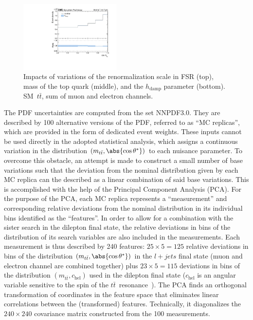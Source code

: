 \begin{figure}
  \includegraphics[width=0.45\textwidth]{fig/chapt7/syst/impacts/CosTopLepTT/hDamp.pdf}
  \caption{Impacts of variations of the renormalization scale in FSR (top), mass of the top quark (middle), and the $h_\text{damp}$ parameter (bottom). SM~$t\bar t$, sum of muon and electron channels.}
  \label{Fig:SystTTSamples}
\end{figure}

The PDF uncertainties are computed from the set NNPDF3.0.
They are described by 100 alternative versions of the PDF, referred to as ``MC replicas'', which are provided in the form of dedicated event weights.
These inputs cannot be used directly in the adopted statistical analysis, which assigns a continuous variation in the distribution $(m_{t\bar t}, \abs{\cos\theta^*})$ to each nuisance parameter.
To overcome this obstacle, an attempt is made to construct a small number of base variations such that the deviation from the nominal distribution given by each MC replica can the described as a linear combination of said base variations.
This is accomplished with the help of the Principal Component Analysis (PCA).
For the purpose of the PCA, each MC replica represents a ``measurement'' and corresponding relative deviations from the nominal distribution in its individual bins identified as the ``features''.
In order to allow for a combination with the sister search in the dilepton final state, the relative deviations in bins of the distribution of its search variables are also included in the measurements.
Each measurement is thus described by 240 features: $25 \times 5 = 125$ relative deviations in bins of the distribution $(m_{t\bar t}, \abs{\cos\theta^*})$ in the $l+jets$ final state (muon and electron channel are combined together) plus $23 \times 5 = 115$ deviations in bins of the distribution $(m_{t\bar t}, c_\text{hel})$ used in the dilepton final state ($c_\text{hel}$ is an angular variable sensitive to the spin of the $t\bar t$~resonance~\cite{CMS-AN-17-202}).
The PCA finds an orthogonal transformation of coordinates in the feature space that eliminates linear correlations between the (transformed) features.
Technically, it diagonalizes the $240 \times 240$ covariance matrix constructed from the 100 measurements.
